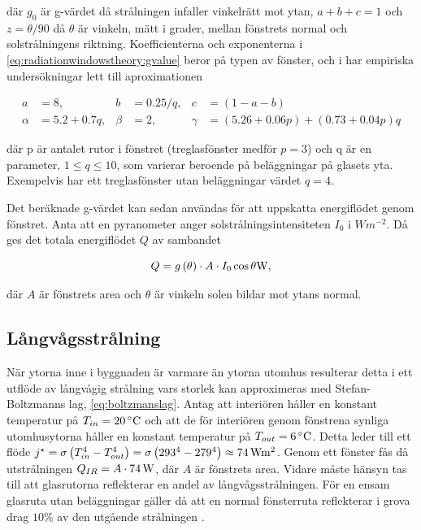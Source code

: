 där $g_0$ är g-värdet då strålningen infaller vinkelrätt mot ytan, $a+b+c=1$ och $z=\theta/90$ då $\theta$ är vinkeln, mätt i grader, mellan fönstrets normal och solstrålningens riktning. Koefficienterna och exponenterna i \eqref{eq:radiationwindowstheory:gvalue} beror på typen av fönster, och i \cite{karlssonroos99} har empiriska undersökningar lett till aproximationen

\begin{align}\label{eq:gconstants}
a & = 8, & b & = 0.25/q, & c & = (1-a-b) \nonumber \\
\alpha & = 5.2 + 0.7q, & \beta & = 2, & \gamma & = (5.26+0.06p) + (0.73+0.04p)q
\end{align}

där p är antalet rutor i fönstret (treglasfönster medför $p = 3$) och q är en parameter, $1 \le q \le 10$, som varierar beroende på beläggningar på glasets yta. Exempelvis har ett treglasfönster utan beläggningar värdet $q=4$.

Det beräknade g-värdet kan sedan användas för att uppskatta energiflödet genom fönstret. Anta att en pyranometer anger solstrålningsintensiteten $I_0$ i $\unit{W m^{-2}}$. Då ges det totala energiflödet $Q$ av sambandet 

\begin{equation}\label{eq:totalsun}
Q = g \left( \theta \right)\cdot A \cdot I_0 \cos{\theta} \unit[]{W},
\end{equation}

där $A$ är fönstrets area och $\theta$ är vinkeln solen bildar mot ytans normal.

\subsection{Långvågsstrålning}

När ytorna inne i byggnaden är varmare än ytorna utomhus resulterar detta i ett utflöde av långvågig strålning vars storlek kan approximeras med Stefan-Boltzmanns lag, \ref{eq:boltzmanslag}. Antag att interiören håller en konstant temperatur på $T_{in} = \unit[20]{^{\circ}C}$ och att de för interiören genom fönstrena synliga utomhusytorna håller en konstant temperatur på $T_{out} = \unit[6]{^{\circ}C}$. Detta leder till ett flöde $j^{\star} = \sigma \left( T_{in}^{4}-T_{out}^4\right) = \sigma \left( 293^4-279^4 \right) \approx \unit[74]{Wm^{2}}$. Genom ett fönster fås då utstrålningen $Q_{IR}=A\cdot\unit[74]{W}$, där $A$ är fönstrets area. Vidare måste hänsyn tas till att glasrutorna reflekterar en andel av långvågsstrålningen. För en ensam glasruta utan beläggningar gäller då att en normal fönsterruta reflekterar i grova drag $10\%$ av den utgående strålningen \cite{gelin05}.

